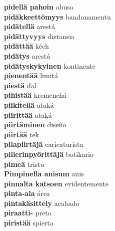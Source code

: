 \textbf{ pidellä pahoin  } abuso \\
\textbf{ pidäkkeettömyys  } bandonamentu \\
\textbf{ pidätellä  } arestá \\
\textbf{ pidättyvyys  } distansia \\
\textbf{ pidättää  } kèch \\
\textbf{ pidätys  } arestá \\
\textbf{ pidätyskykyinen  } kontinente \\
\textbf{ pienentää  } limitá \\
\textbf{ piestä  } dal \\
\textbf{ pihistää  } kremenchá \\
\textbf{ piikitellä  } ataká \\
\textbf{ piirittää  } ataká \\
\textbf{ piirtäminen  } diseño \\
\textbf{ piirtää  } tek \\
\textbf{ pilapiirtäjä  } caricaturista \\
\textbf{ pillerinpyörittäjä  } botikario \\
\textbf{ pimeä  } tristu \\
\textbf{ Pimpinella anisum  } anis \\
\textbf{ pinnalta katsoen  } evidentemente \\
\textbf{ pinta-ala  } área \\
\textbf{ pintakäsittely  } acabado \\
\textbf{ piraatti-  } preto \\
\textbf{ piristää  } spierta \\
